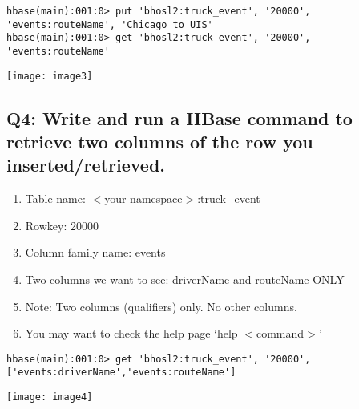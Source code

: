 \documentclass[]{article}
\begin{document}
\begin{verbatim}
hbase(main):001:0> put 'bhosl2:truck_event', '20000', 'events:routeName', 'Chicago to UIS'
hbase(main):001:0> get 'bhosl2:truck_event', '20000', 'events:routeName'
\end{verbatim}

\texttt{[image: image3]} %

\clearpage

\subsection*{Q4: Write and run a HBase command to retrieve two columns of the row you inserted/retrieved.} 
\begin{enumerate}[before=\itshape,font=\normalfont,label=\alph*.]
	\item Table name: $<$your-namespace$>$:truck\_event
	\item Rowkey: 20000
	\item Column family name: events
	\item Two columns we want to see: driverName and routeName ONLY
	\item Note: Two columns (qualifiers) only. No other columns.
	\item You may want to check the help page ‘help $<$command$>$’
\end{enumerate}

\begin{verbatim}
hbase(main):001:0> get 'bhosl2:truck_event', '20000', ['events:driverName','events:routeName']
\end{verbatim}

\texttt{[image: image4]} %
\end{document}
